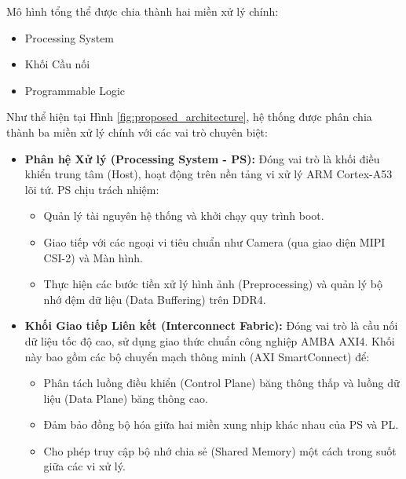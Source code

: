 Mô hình tổng thể được chia thành hai miền xử lý chính:
\begin{itemize}
    \item Processing System
    \item Khối Cầu nối
    \item Programmable Logic
\end{itemize}

Như thể hiện tại Hình \ref{fig:proposed_architecture}, hệ thống được phân chia thành ba miền xử lý chính với các vai trò chuyên biệt:

\begin{itemize}
    \item \textbf{Phân hệ Xử lý (Processing System - PS):} 
    Đóng vai trò là khối điều khiển trung tâm (Host), hoạt động trên nền tảng vi xử lý ARM Cortex-A53 lõi tứ. PS chịu trách nhiệm:
    \begin{itemize}
        \item Quản lý tài nguyên hệ thống và khởi chạy quy trình boot.
        \item Giao tiếp với các ngoại vi tiêu chuẩn như Camera (qua giao diện MIPI CSI-2) và Màn hình.
        \item Thực hiện các bước tiền xử lý hình ảnh (Preprocessing) và quản lý bộ nhớ đệm dữ liệu (Data Buffering) trên DDR4.
    \end{itemize}

    \item \textbf{Khối Giao tiếp Liên kết (Interconnect Fabric):} 
    Đóng vai trò là cầu nối dữ liệu tốc độ cao, sử dụng giao thức chuẩn công nghiệp AMBA AXI4. Khối này bao gồm các bộ chuyển mạch thông minh (AXI SmartConnect) để:
    \begin{itemize}
        \item Phân tách luồng điều khiển (Control Plane) băng thông thấp và luồng dữ liệu (Data Plane) băng thông cao.
        \item Đảm bảo đồng bộ hóa giữa hai miền xung nhịp khác nhau của PS và PL.
        \item Cho phép truy cập bộ nhớ chia sẻ (Shared Memory) một cách trong suốt giữa các vi xử lý.
    \end{itemize}


\end{itemize}
